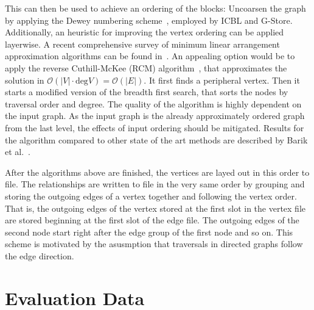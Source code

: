         This can then be used to achieve an ordering of the blocks:
        Uncoarsen the graph by applying the Dewey numbering scheme~\autocite{dewey1894decimal}, employed by ICBL and G-Store.
        Additionally, an heuristic for improving the vertex ordering can be applied layerwise. 
        A recent comprehensive survey of minimum linear arrangement approximation algorithms can be found in~\autocite{barik2020vertex}.
        An appealing option would be to apply the reverse Cuthill-McKee (RCM) algorithm~\autocite{Cuthill1969ReducingTB}, that approximates the solution in $\mathcal{O}(|V| \cdot \text{deg}{V}) = \mathcal{O}(|E|)$. 
        It first finds a peripheral vertex.
        Then it starts a modified version of the breadth first search, that sorts the nodes by traversal order and degree.
        The quality of the algorithm is highly dependent on the input graph.
        As the input graph is the already approximately ordered graph from the last level, the effects of input ordering should be mitigated.
        Results for the algorithm compared to other state of the art methods are described by Barik et al.~\autocite{barik2020vertex}.
        
        After the algorithms above are finished, the vertices are layed out in this order to file. 
        The relationships are written to file in the very same order by grouping and storing the outgoing edges of a vertex together and following the vertex order.
        That is, the outgoing edges of the vertex stored at the first slot in the vertex file are stored beginning at the first slot of the edge file. 
        The outgoing edges of the second node start right after the edge group of the first node and so on.
        This scheme is motivated by the asusmption that traversals in directed graphs follow the edge direction.

\chapter{Evaluation Data}














